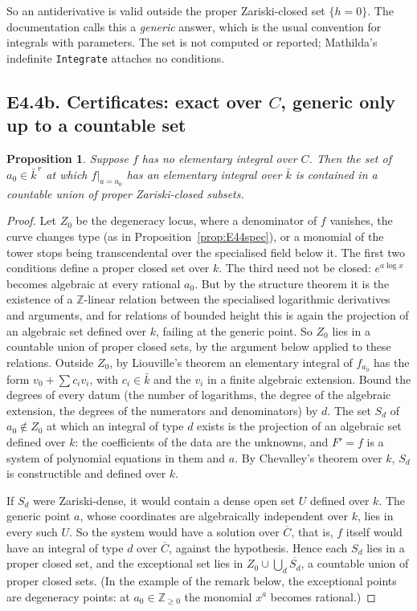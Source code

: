 \documentclass[11pt]{article}
\newtheorem{proposition}[theorem]{Proposition}
\theoremstyle{definition}
\theoremstyle{remark}
\newcommand{\Z}{\mathbb{Z}}
\newcommand{\code}[1]{\texttt{#1}}
\begin{document}
\noindent So an antiderivative is valid outside the proper Zariski-closed set
$\{h=0\}$. The documentation calls this a \emph{generic} answer, which is the usual
convention for integrals with parameters. The set is not computed or reported;
Mathilda's indefinite \code{Integrate} attaches no conditions.

\subsection*{E4.4b. Certificates: exact over $C$, generic only up to a countable set}

\begin{proposition}\label{prop:E44cert}
Suppose $f$ has no elementary integral over $C$. Then the set of $a_0\in\bar k^{\,r}$
at which $f|_{a=a_0}$ has an elementary integral over $\bar k$ is contained in a
countable union of proper Zariski-closed subsets.
\end{proposition}
\begin{proof}
Let $Z_0$ be the degeneracy locus, where a denominator of $f$ vanishes, the curve
changes type (as in Proposition~\ref{prop:E44spec}), or a monomial of the tower stops
being transcendental over the specialised field below it. The first two conditions
define a proper closed set over $k$. The third need not be closed: $e^{a\log x}$
becomes algebraic at every rational $a_0$. But by the structure theorem it is the
existence of a $\Z$-linear relation between the specialised logarithmic derivatives
and arguments, and for relations of bounded height this is again the projection of an
algebraic set defined over $k$, failing at the generic point. So $Z_0$ lies in a
countable union of proper closed sets, by the argument below applied to these
relations. Outside $Z_0$, by Liouville's theorem an elementary integral of $f_{a_0}$ has the form
$v_0+\sum c_iv_i$, with $c_i\in\bar k$ and the $v_i$ in a finite algebraic extension.
Bound the degrees of every datum (the number of logarithms, the degree of the algebraic
extension, the degrees of the numerators and denominators) by $d$. The set $S_d$ of
$a_0\notin Z_0$ at which an integral of type $d$ exists is the projection of an algebraic
set defined over $k$: the coefficients of the data are the unknowns, and $F'=f$ is a
system of polynomial equations in them and $a$. By Chevalley's theorem over $k$, $S_d$
is constructible and defined over $k$.

If $S_d$ were Zariski-dense, it would contain a dense open set $U$ defined over $k$.
The generic point $a$, whose coordinates are algebraically independent over $k$, lies
in every such $U$. So the system would have a solution over $\overline{C}$, that is,
$f$ itself would have an integral of type $d$ over $\overline{C}$, against the
hypothesis. Hence each $S_d$ lies in a proper closed set, and the exceptional set lies in
$Z_0\cup\bigcup_d\overline{S_d}$, a countable union of proper closed sets. (In the
example of the remark below, the exceptional points are degeneracy points: at
$a_0\in\Z_{\ge0}$ the monomial $x^{a}$ becomes rational.)
\end{proof}
\end{document}
